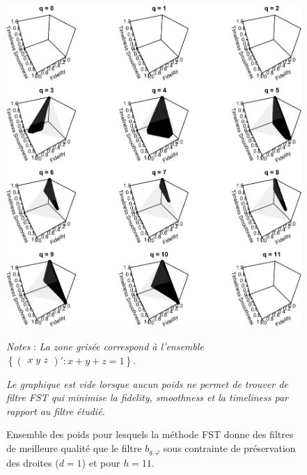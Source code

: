 \documentclass[
  11pt,
  french,
  a4paper]{article}
\newcommand\1{\mathds{1}}
\begin{document}
\begin{figure}[H]

{\centering \includegraphics{img/bookdown/pdf/rkhs11d1-1} 

}

\caption[Ensemble des poids pour lesquels la méthode FST donne des filtres de meilleure qualité que le filtre \(b_{q,\varphi}\) sous contrainte de préservation des droites (\(d=1\)) et pour \(h=11\)]{Ensemble des poids pour lesquels la méthode FST donne des filtres de meilleure qualité que le filtre \(b_{q,\varphi}\) sous contrainte de préservation des droites (\(d=1\)) et pour \(h=11\).}\label{fig:rkhs11d1}

\footnotesize


\emph{Notes} : \emph{La zone grisée correspond à l'ensemble \(\left\{\begin{pmatrix}x \; y \; z \end{pmatrix}' : x+y+z=1\right\}\).}

\emph{Le graphique est vide lorsque aucun poids ne permet de trouver de filtre FST qui minimise la \emph{fidelity}, \emph{smoothness} et la \emph{timeliness} par rapport au filtre étudié.}
\normalsize\end{figure}
\end{document}
